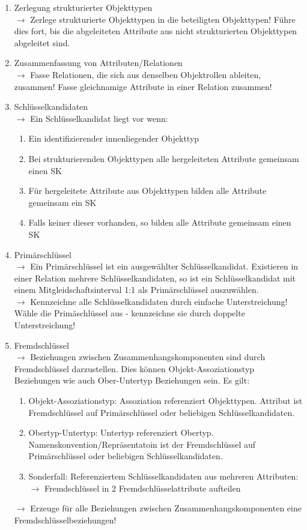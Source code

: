 \documentclass[a4paper,10pt]{scrartcl}
\begin{document}
\begin{enumerate}
    \item  Zerlegung strukturierter Objekttypen \\
    $\rightarrow$ Zerlege strukturierte Objekttypen in die beteiligten Objekttypen! Führe dies fort, bis die abgeleiteten Attribute aus nicht strukturierten Objekttypen abgeleitet sind. 
    
    \item Zusammenfassung von Attributen/Relationen \\
    $\rightarrow$ Fasse Relationen, die sich aus denselben Objektrollen ableiten, zusammen! Fasse gleichnamige Attribute in einer Relation zusammen!
    
    \item Schlüsselkandidaten\\
    $\rightarrow$ Ein Schlüsselkandidat liegt vor wenn:
    \begin{enumerate}
        \item Ein identifizierender innenliegender Objekttyp
        \item Bei strukturierenden Objekttypen alle hergeleiteten Attribute gemeinsam einen SK
        \item Für hergeleitete Attribute aus Objekttypen bilden alle Attribute gemeinsam ein SK
        \item Falls keiner dieser vorhanden, so bilden alle Attribute gemeinsam einen SK
    \end{enumerate} 
    
    \item Primärschlüssel \\
    $\rightarrow$ 
    Ein Primärschlüssel ist ein ausgewählter Schlüsselkandidat. Existieren in einer Relation mehrere Schlüsselkandidaten, so ist ein Schlüsselkandidat mit einem Mitgleidschaftsinterval 1:1 als Primärschlüssel auszuwählen. \\
    $\rightarrow$ 
    Kennzeichne alle Schlüsselkandidaten durch einfache Unterstreichung! Wähle die Primäschlüssel aus - kennzeichne sie durch doppelte Unterstreichung!
    
    \item Fremdschlüssel \\
    $\rightarrow$ Beziehungen zwischen Zusammenhangskomponenten sind durch Fremdschlüssel darzustellen. Dies können Objekt-Assoziationstyp Beziehungen wie auch Ober-Untertyp Beziehungen sein. Es gilt:
    \begin{enumerate}
        \item Objekt-Assoziationstyp: Assoziation referenziert Objekttypen. Attribut ist Fremdschlüssel auf Primärschlüssel oder beliebigen Schlüsselkandidaten.
        \item Obertyp-Untertyp: Untertyp referenziert Obertyp. Namenskonvention/Repräsentatoin ist der Fremdschlüssel auf Primärschlüssel oder beliebigen Schlüsselkandidaten.
        \item Sonderfall: Referenziertem Schlüsselkandidaten aus mehreren Attributen:
        $\rightarrow$ Fremdschlüssel in 2 Fremdschlüsselattribute aufteilen
    \end{enumerate}
    $\rightarrow$ Erzeuge für alle Beziehungen zwischen Zusammenhangskomponenten eine Fremdschlüsselbeziehungen!
\end{enumerate}
\end{document}
